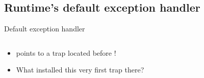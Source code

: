%
%
\subsection*{Runtime's default exception handler}


\begin{frame}{Default exception handler}
\begin{columns}
\begin{column}{0.5\textwidth}
\begin{itemize}
\item {} points to a trap located before !
\item What installed this very first trap there?
\end{itemize}
\bigskip
{}
\bigskip
\inputminted[fontsize=\footnotesize]{text}{../src/default/default.out}
\end{column}
\begin{column}{0.5\textwidth}
\centering
{}%
%
\end{column}
\end{columns}
\end{frame}


